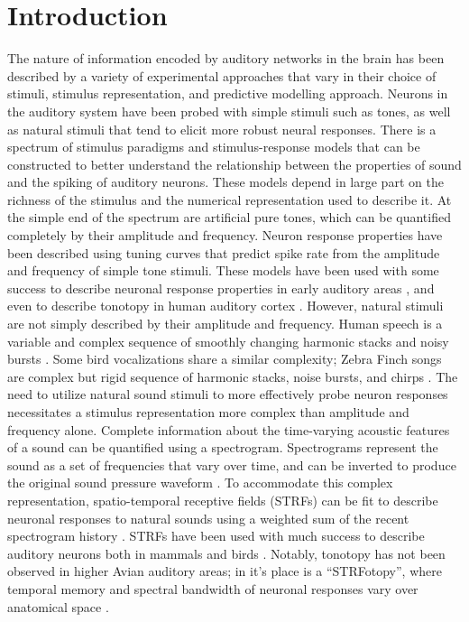 \chapter{Introduction}

The nature of information encoded by auditory networks in the brain has been described by a variety of experimental approaches that vary in their choice of stimuli, stimulus representation, and predictive modelling approach. Neurons in the auditory system have been probed with simple stimuli such as tones, as well as natural stimuli that tend to elicit more robust neural responses. There is a spectrum of stimulus paradigms and stimulus-response models that can be constructed to better understand the relationship between the properties of sound and the spiking of auditory neurons. These models depend in large part on the richness of the stimulus and the numerical representation used to describe it. At the simple end of the spectrum are artificial pure tones, which can be quantified completely by their amplitude and frequency. Neuron response properties have been described using tuning curves that predict spike rate from the amplitude and frequency of simple tone stimuli. These models have been used with some success to describe neuronal response properties in early auditory areas \cite{REF}, and even to describe tonotopy in human auditory cortex \cite{REF}.
However, natural stimuli are not simply described by their amplitude and frequency. Human speech is a variable and complex sequence of smoothly changing harmonic stacks and noisy bursts \cite{REF}. Some bird vocalizations share a similar complexity; Zebra Finch songs are complex but rigid sequence of harmonic stacks, noise bursts, and chirps \cite{REF}. The need to utilize natural sound stimuli to more effectively probe neuron responses necessitates a stimulus representation more complex than amplitude and frequency alone. Complete information about the time-varying acoustic features of a sound can be quantified using a spectrogram. Spectrograms represent the sound as a set of frequencies that vary over time, and can be inverted to produce the original sound pressure waveform \cite{Cohen1995}. To accommodate this complex representation, spatio-temporal receptive fields (STRFs) can be fit to describe neuronal responses to natural sounds using a weighted sum of the recent spectrogram history \cite{REF}. STRFs have been used with much success to describe auditory neurons both in mammals \cite{REF} and birds \cite{REF}. Notably, tonotopy has not been observed in higher Avian auditory areas; in it’s place is a “STRFotopy”, where temporal memory and spectral bandwidth of neuronal responses vary over anatomical space \cite{Kim2011}.
